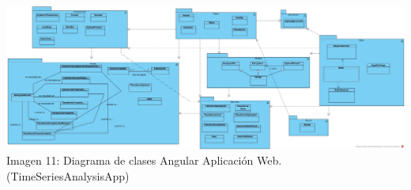 \documentclass[14pt]{extarticle}
\theoremstyle{definition}
\theoremstyle{remark}
\begin{document}
\begin{landscape}
	\begin{center}
	\includegraphics[scale=0.3]{TimeSeriesAnalysisApp.jpg}
	\\Imagen 11: Diagrama de clases Angular Aplicación Web. (TimeSeriesAnalysisApp)
	\end{center}
\end{landscape}

\newpage
\end{document}
